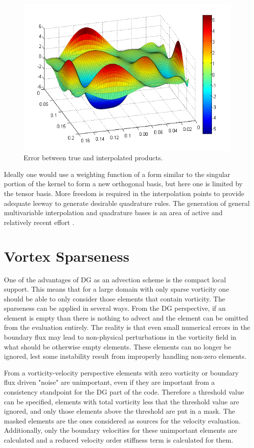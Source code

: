 \documentclass[letterpaper,12pt]{report}
\begin{document}
\begin{figure}
\centering
\includegraphics[width=5.5in]{wKerror.PNG}
\caption{\label{fig:wKerror}Error between true and interpolated products.}
\end{figure}

Ideally one would use a weighting function of a form similar to the singular portion of the kernel to form a new orthogonal basis, but here one is limited by the tensor basis. More freedom is required in the interpolation points to provide adequate leeway to generate desirable quadrature rules. The generation of general multivariable interpolation and quadrature bases is an area of active and relatively recent effort \cite{Gasca2000,Xu2012,Gautschi2013}.

%
\section{Vortex Sparseness}
One of the advantages of DG as an advection scheme is the compact local support. This means that for a large domain with only sparse vorticity one should be able to only consider those elements that contain vorticity. The sparseness can be applied in several ways. From the DG perspective, if an element is empty than there is nothing to advect and the element can be omitted from the evaluation entirely. The reality is that even small numerical errors in the boundary flux may lead to non-physical perturbations in the vorticity field in what should be otherwise empty elements. These elements can no longer be ignored, lest some instability result from improperly handling non-zero elements.

From a vorticity-velocity perspective elements with zero vorticity or boundary flux driven "noise" are unimportant, even if they are important from a consistency standpoint for the DG part of the code. Therefore a threshold value can be specified, elements with total vorticity less that the threshold value are ignored, and only those elements above the threshold are put in a mask. The masked elements are the ones considered as sources for the velocity evaluation. Additionally, only the boundary velocities for these unimportant elements are calculated and a reduced velocity order stiffness term is calculated for them.
\end{document}

